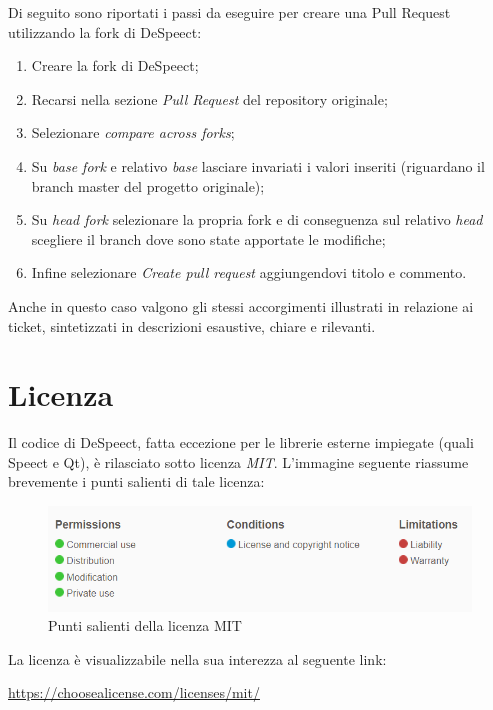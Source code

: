 \documentclass[openany,12pt,a4paper]{report}
\begin{document}
	Di seguito sono riportati i passi da eseguire per creare una Pull
	Request utilizzando la fork di DeSpeect:
	\begin{enumerate}
		\item Creare la fork di DeSpeect;
		\item Recarsi nella sezione \textit{Pull Request} del repository originale;
		\item Selezionare \textit{compare across forks};
		\item Su \textit{base fork} e relativo \textit{base} lasciare invariati i valori inseriti (riguardano il branch master del progetto originale);
		\item Su \textit{head fork} selezionare la propria fork e di conseguenza sul relativo \textit{head} scegliere
		il branch dove sono state apportate le modifiche;
		\item Infine selezionare \textit{Create pull request} aggiungendovi titolo e commento.
	\end{enumerate}
	Anche in questo caso valgono gli stessi accorgimenti illustrati in relazione ai ticket, sintetizzati in descrizioni esaustive, chiare e rilevanti.
	
	\chapter{Licenza}
	
	Il codice di DeSpeect, fatta eccezione per le librerie esterne impiegate (quali Speect e Qt), è rilasciato sotto licenza \textit{MIT}. L'immagine seguente riassume brevemente i punti salienti di tale licenza:
	
	\begin{figure}[H]
		\hspace*{-5mm}
		\includegraphics[scale=1]{licenza}
		\centering
		\caption{Punti salienti della licenza MIT}
	\end{figure}
	
	La licenza è visualizzabile nella sua interezza al seguente link:
	\begin{center}
		\url{https://choosealicense.com/licenses/mit/}
	\end{center} 

	\printglossary[style=glossaryStyle, nonumberlist]
	
\end{document}

